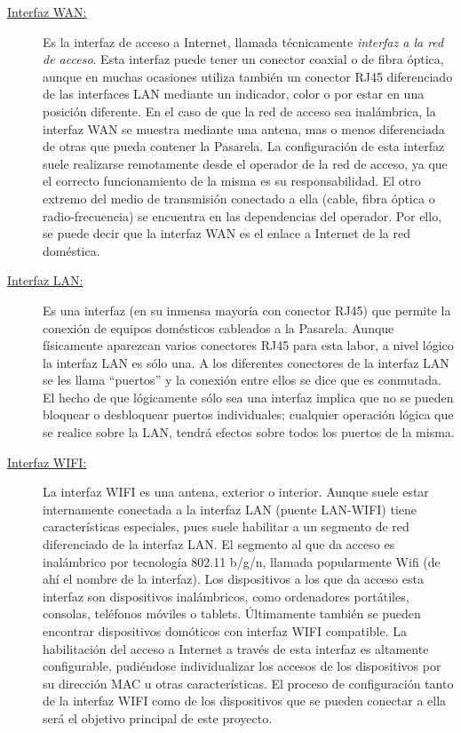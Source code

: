 \documentclass[12pt, twoside]{article}
\begin{document}
    \begin{description}
        \item[\underline{Interfaz WAN:}] Es la interfaz de acceso a Internet, llamada técnicamente \textit{interfaz a la red de acceso}. Esta interfaz puede tener un conector coaxial o de fibra óptica, aunque en muchas ocasiones utiliza también un conector RJ45 diferenciado de las interfaces LAN mediante un indicador, color o por estar en una posición diferente. En el caso de que la red de acceso sea inalámbrica, la interfaz WAN se muestra mediante una antena, mas o menos diferenciada de otras que pueda contener la Pasarela. La configuración de esta interfaz suele realizarse remotamente desde el operador de la red de acceso, ya que el correcto funcionamiento de la misma es su responsabilidad. El otro extremo del medio de transmisión conectado a ella (cable, fibra óptica o radio-frecuencia) se encuentra en las dependencias del operador. Por ello, se puede decir que la interfaz WAN es el enlace a Internet de la red doméstica.
        \item[\underline{Interfaz LAN:}] Es una interfaz (en su inmensa mayoría con conector RJ45) que permite la conexión de equipos domésticos cableados a la Pasarela. Aunque físicamente aparezcan varios conectores RJ45 para esta labor, a nivel lógico la interfaz LAN es sólo una. A los diferentes conectores de la interfaz LAN se les llama ``puertos'' y la conexión entre ellos se dice que es conmutada. El hecho de que lógicamente sólo sea una interfaz implica que no se pueden bloquear o desbloquear puertos individuales; cualquier operación lógica que se realice sobre la LAN, tendrá efectos sobre todos los puertos de la misma.
        \item[\underline{Interfaz WIFI:}] La interfaz WIFI es una antena, exterior o interior. Aunque suele estar internamente conectada a la interfaz LAN (puente LAN-WIFI) tiene características especiales, pues suele habilitar a un segmento de red diferenciado de la interfaz LAN. El segmento al que da acceso es inalámbrico por tecnología 802.11 b/g/n, llamada popularmente Wifi (de ahí el nombre de la interfaz). Los dispositivos a los que da acceso esta interfaz son dispositivos inalámbricos, como ordenadores portátiles, consolas, teléfonos móviles o tablets. Últimamente también se pueden encontrar dispositivos domóticos con interfaz WIFI compatible. La habilitación del acceso a Internet a través de esta interfaz es altamente configurable, pudiéndose individualizar los accesos de los dispositivos por su dirección MAC u otras características. El proceso de configuración tanto de la interfaz WIFI como de los dispositivos que se pueden conectar a ella será el objetivo principal de este proyecto.
    \end{description}
\end{document}
